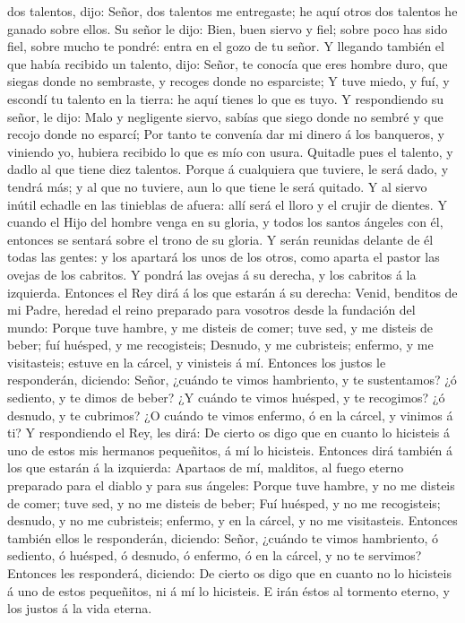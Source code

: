 dos talentos, dijo: Señor, dos talentos me entregaste; he aquí otros dos
talentos he ganado sobre ellos.  Su señor le dijo: Bien,
buen siervo y fiel; sobre poco has sido fiel, sobre mucho te pondré:
entra en el gozo de tu señor.  Y llegando también el que
había recibido un talento, dijo: Señor, te conocía que eres hombre duro,
que siegas donde no sembraste, y recoges donde no esparciste;
 Y tuve miedo, y fuí, y escondí tu talento en la tierra: he
aquí tienes lo que es tuyo.  Y respondiendo su señor, le
dijo: Malo y negligente siervo, sabías que siego donde no sembré y que
recojo donde no esparcí;  Por tanto te convenía dar mi
dinero á los banqueros, y viniendo yo, hubiera recibido lo que es mío
con usura.  Quitadle pues el talento, y dadlo al que tiene
diez talentos.  Porque á cualquiera que tuviere, le será
dado, y tendrá más; y al que no tuviere, aun lo que tiene le será
quitado.  Y al siervo inútil echadle en las tinieblas de
afuera: allí será el lloro y el crujir de dientes.  Y
cuando el Hijo del hombre venga en su gloria, y todos los santos ángeles
con él, entonces se sentará sobre el trono de su gloria.  Y
serán reunidas delante de él todas las gentes: y los apartará los unos
de los otros, como aparta el pastor las ovejas de los cabritos.
 Y pondrá las ovejas á su derecha, y los cabritos á la
izquierda.  Entonces el Rey dirá á los que estarán á su
derecha: Venid, benditos de mi Padre, heredad el reino preparado para
vosotros desde la fundación del mundo:  Porque tuve hambre,
y me disteis de comer; tuve sed, y me disteis de beber; fuí huésped, y
me recogisteis;  Desnudo, y me cubristeis; enfermo, y me
visitasteis; estuve en la cárcel, y vinisteis á mí. 
Entonces los justos le responderán, diciendo: Señor, ¿cuándo te vimos
hambriento, y te sustentamos? ¿ó sediento, y te dimos de beber?
 ¿Y cuándo te vimos huésped, y te recogimos? ¿ó desnudo, y
te cubrimos?  ¿O cuándo te vimos enfermo, ó en la cárcel, y
vinimos á ti?  Y respondiendo el Rey, les dirá: De cierto
os digo que en cuanto lo hicisteis á uno de estos mis hermanos
pequeñitos, á mí lo hicisteis.  Entonces dirá también á los
que estarán á la izquierda: Apartaos de mí, malditos, al fuego eterno
preparado para el diablo y para sus ángeles:  Porque tuve
hambre, y no me disteis de comer; tuve sed, y no me disteis de beber;
 Fuí huésped, y no me recogisteis; desnudo, y no me
cubristeis; enfermo, y en la cárcel, y no me visitasteis. 
Entonces también ellos le responderán, diciendo: Señor, ¿cuándo te vimos
hambriento, ó sediento, ó huésped, ó desnudo, ó enfermo, ó en la cárcel,
y no te servimos?  Entonces les responderá, diciendo: De
cierto os digo que en cuanto no lo hicisteis á uno de estos pequeñitos,
ni á mí lo hicisteis.  E irán éstos al tormento eterno, y
los justos á la vida eterna.

